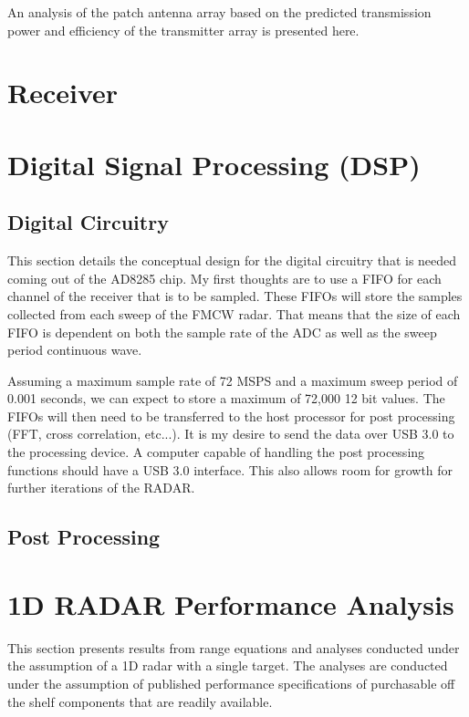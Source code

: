 \documentclass[]{article}
\begin{document}
An analysis of the patch antenna array based on the predicted transmission power and efficiency of the transmitter array is presented here.

\section{Receiver}


\section{Digital Signal Processing (DSP)}

\subsection{Digital Circuitry}
This section details the conceptual design for the digital circuitry that is needed coming out of the AD8285 chip. My first thoughts are to use a FIFO for each channel of the receiver that is to be sampled. These FIFOs will store the samples collected from each sweep of the FMCW radar. That means that the size of each FIFO is dependent on both the sample rate of the ADC as well as the sweep period continuous wave.

Assuming a maximum sample rate of 72 MSPS and a maximum sweep period of 0.001 seconds, we can expect to store a maximum of 72,000 12 bit values. The FIFOs will then need to be transferred to the host processor for post processing (FFT, cross correlation, etc...). It is my desire to send the data over USB 3.0 to the processing device. A computer capable of handling the post processing functions should have a USB 3.0 interface. This also allows room for growth for further iterations of the RADAR.

\subsection{Post Processing}

\section{1D RADAR Performance Analysis}

This section presents results from range equations and analyses conducted under the assumption of a 1D radar with a single target. The analyses are conducted under the assumption of published performance specifications of purchasable off the shelf components that are readily available.
\end{document}

